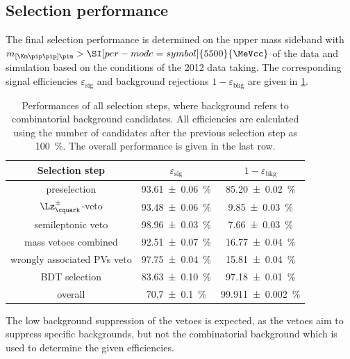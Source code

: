 \subsection{Selection performance}
\label{sec:selectionPerformance}

The final selection performance is determined on the upper mass sideband with \mbox{$m_{\left[\Km\pip\pip\right]\pim}>\SI[per-mode=symbol]{5500}{\MeVcc}$} of the data and simulation based on the conditions of the \num{2012} data taking.
The corresponding signal efficiencies $\varepsilon_{\text{sig}}$ and background rejections $1-\varepsilon_{\text{bkg}}$ are given in \cref{tab:selPerform}.
\begin{table}[tbp]
	\centering
	\caption{Performances of all selection steps, where background refers to combinatorial background candidates.
	All efficiencies are calculated using the number of candidates after the previous selection step as \SI{100}{\percent}.
	The overall performance is given in the last row.}
	\begin{tabular}{ccc}
		\toprule
		Selection step						& $\varepsilon_{\text{sig}}$  & $1-\varepsilon_{\text{bkg}}$ \\
		\midrule
		preselection						& \SI{93.61\pm0.06}{\percent} & \SI{85.20\pm0.02}{\percent} \\
		\midrule
		$\Lz^\pm_\cquark$-veto				& \SI{93.48\pm0.06}{\percent} & \SI{9.85\pm0.03}{\percent} \\
		semileptonic veto					& \SI{98.96\pm0.03}{\percent} & \SI{7.66\pm0.03}{\percent} \\
		mass vetoes combined				& \SI{92.51\pm0.07}{\percent} & \SI{16.77\pm0.04}{\percent} \\
		\midrule
		wrongly associated \ac{PV}s veto	& \SI{97.75\pm0.04}{\percent} & \SI{15.81\pm0.04}{\percent} \\
		BDT selection						& \SI{83.63\pm0.10}{\percent} & \SI{97.18\pm0.01}{\percent} \\
		\midrule
		overall								& \SI{70.7\pm0.1}{\percent}   & \SI{99.911\pm0.002}{\percent} \\
		\bottomrule
	\end{tabular}
	\label{tab:selPerform}
\end{table}
The low background suppression of the vetoes is expected, as the vetoes aim to suppress specific backgrounds, but not the combinatorial background which is used to determine the given efficiencies.

